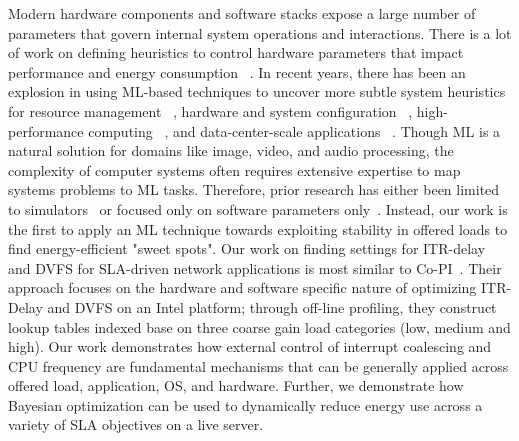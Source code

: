 Modern hardware components and software stacks expose a large number of parameters that govern internal system operations and interactions. There is a lot of work on defining heuristics to control hardware parameters that impact performance and energy consumption ~\cite{10.1145/2626401.2626411, 7108419, caloree, 10.1145/2775054.2694373, arxiv.2112.07010, heuristics_0}. In recent years, there has been an explosion in using ML-based techniques \cite{Wu2023, 10.1145/3307650.3326633} to uncover more subtle system heuristics for resource management ~\cite{10.5555/1855591.1855592, 4771801, 10.1145/1995896.1995927, paragon, quasar, 5695560, 10.1145/2815400.2815403, 10.1145/1394608.1382172, caloree, 10.1145/2775054.2694373, carat, flicker, koala, 6522303}, hardware and system configuration ~\cite{Siblingrivalry, 7207248, mem_cocktail, 5695560, 10.5555/1855591.1855592, 10.1145/1168857.1168881, 1598114, 10.1145/2829950, 10.1145/3035918.3064029, 6493638, 6730744, 7551432, bestconfig}, high-performance computing ~\cite{10.1145/1229428.1229479, 10.1145/2775054.2694373, 10.1145/1394608.1382172, 10.1145/2872362.2872375, Siblingrivalry, 1598114, 10.1145/3453483.3454109}, and data-center-scale applications ~\cite{paragon, quasar, 6730744, 7207248, 10.1145/3035918.3064029, bestconfig, 4061117, nurd, 10.1145/3468264.3468603, 10.1145/3342195.3387520, 10.1145/3173162.3173206, cello}. Though ML is a natural solution for domains like image, video, and audio processing, the complexity of computer systems often requires extensive expertise to map systems problems to ML tasks. Therefore, prior research has either been limited to simulators~\cite{4771801, 10.1145/1995896.1995927, 5695560, 10.1145/1394608.1382172, 1635956, mem_cocktail, 1598114, 10.1145/1839667.1839670, 6493638, 7851506, nurd} or focused only on software parameters only~\cite{paragon, quasar, carat, 6522303, 6730744, Siblingrivalry, 10.1145/2872362.2872375, bestconfig, cello, 10.1145/3173162.3173206, 10.1145/3342195.3387520}. Instead, our work is the first to apply an ML technique towards exploiting stability in offered loads to find energy-efficient "sweet spots". Our work on finding settings for ITR-delay and DVFS for SLA-driven network applications is most similar to Co-PI~\cite{9248059}. Their approach focuses on the hardware and software specific nature of optimizing ITR-Delay and DVFS on an Intel platform; through off-line profiling, they construct lookup tables indexed base on three coarse gain load categories (low, medium and high). Our work demonstrates how external control of interrupt coalescing and CPU frequency are fundamental mechanisms that can be generally applied across offered load, application, OS, and hardware. Further, we demonstrate how Bayesian optimization can be used to dynamically reduce energy use across a variety of SLA objectives on a live server.